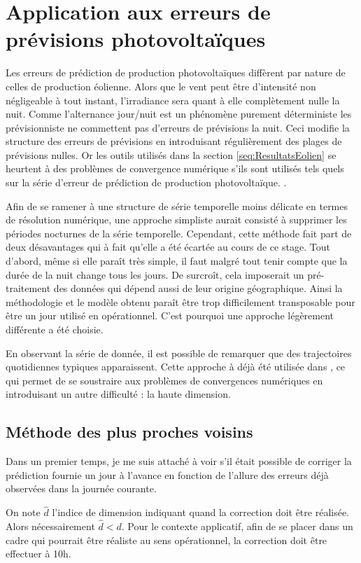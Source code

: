 \documentclass[12pt]{report}
\begin{document}
\chapter{Application aux erreurs de prévisions photovoltaïques}
Les erreurs de prédiction de production photovoltaïques diffèrent par nature de celles de production éolienne. Alors que le vent peut être d'intensité non négligeable à tout instant, l'irradiance sera quant à elle complètement nulle la nuit. Comme l'alternance jour/nuit est un phénomène purement déterministe les prévisionniste ne commettent pas d'erreurs de prévisions la nuit. Ceci modifie la structure des erreurs de prévisions en introduisant régulièrement des plages de prévisions nulles. Or les outils utilisés dans la section \ref{seq:ResultatsEolien} se heurtent à des problèmes de convergence numérique s'ils sont utilisés tels quels sur la série d'erreur de prédiction de production photovoltaïque. .

Afin de se ramener à une structure de série temporelle moins délicate en termes de résolution numérique, une approche simpliste aurait consisté à supprimer les périodes nocturnes de la série temporelle. Cependant, cette méthode fait part de deux désavantages qui à fait qu'elle a été écartée au cours de ce stage. Tout d'abord, même si elle paraît très simple, il faut malgré tout tenir compte que la durée de la nuit change tous les jours. De surcroît, cela imposerait un pré-traitement des données qui dépend aussi de leur origine géographique. Ainsi la méthodologie et le modèle obtenu paraît être trop difficilement transposable pour être un jour utilisé en opérationnel. C'est pourquoi une approche légèrement différente a été choisie.

En observant la série de donnée, il est possible de remarquer que des trajectoires quotidiennes typiques apparaissent. Cette approche à déjà été utilisée dans \cite{latimier_gestion_2016}, ce qui permet de se soustraire aux problèmes de convergences numériques en introduisant un autre difficulté : la haute dimension.

\section{Méthode des plus proches voisins}
Dans un premier temps, je me suis attaché à voir s'il était possible de corriger la prédiction fournie un jour à l'avance en fonction de l'allure des erreurs déjà observées dans la journée courante.

On note $\widehat{d}$ l'indice de dimension indiquant quand la correction doit être réalisée. Alors nécessairement $\widehat{d} < d$. Pour le contexte applicatif, afin de se placer dans un cadre qui pourrait être réaliste au sens opérationnel, la correction doit être effectuer à 10h.
\end{document}
